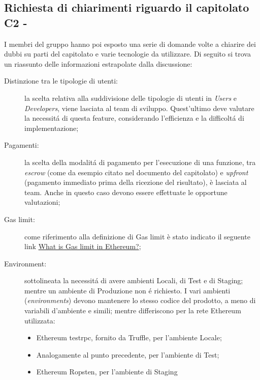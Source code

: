 \subsection{Richiesta di chiarimenti riguardo il capitolato C2 - \NomeProgetto}
I membri del gruppo hanno poi esposto una serie di domande volte a chiarire dei dubbi su parti del capitolato e varie tecnologie da utilizzare.
Di seguito si trova un riassunto delle informazioni estrapolate dalla discussione:
\begin{description}
	\item[Distinzione tra le tipologie di utenti:] la scelta relativa alla suddivisione delle tipologie di utenti in \textit{Users} e \textit{Developers}, viene lasciata al team di sviluppo. Quest'ultimo deve valutare la necessitá di questa feature, considerando l'efficienza e la difficoltá di implementazione;
	\item[Pagamenti:] la scelta della modalitá di pagamento per l'esecuzione di una funzione, tra \textit{escrow} (come da esempio citato nel documento del capitolato) e \textit{upfront} (pagamento immediato prima della ricezione del risultato), è lasciata al team. Anche in questo caso devono essere effettuate le opportune valutazioni;
	\item[Gas limit:] come riferimento alla definizione di Gas limit è stato indicato il seguente link \href{https://bitcoin.stackexchange.com/questions/39132/what-is-gas-limit-in-ethereum}{What is Gas limit in Ethereum?};
	\item[Environment:] sottolineata la necessitá di avere ambienti Locali, di Test e di Staging; mentre un ambiente di Produzione non é richiesto. I vari ambienti (\textit{environments}) devono mantenere lo stesso codice del prodotto, a meno di variabili d'ambiente e simili; mentre differiscono per la rete Ethereum utilizzata:
	\begin{itemize}
		\item Ethereum testrpc, fornito da Truffle, per l'ambiente Locale;
		\item Analogamente al punto precedente, per l'ambiente di Test;
		\item Ethereum Ropsten, per l'ambiente di Staging
	\end{itemize}
\end{description}

